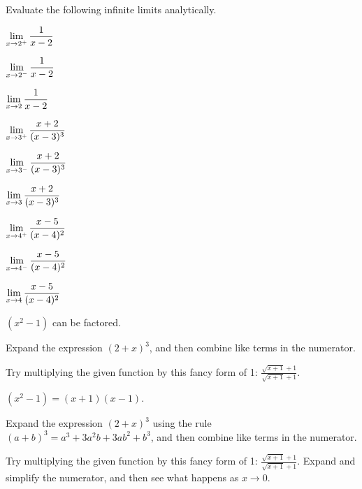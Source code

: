 \begin{activity} \label{A:1.2.1}  Evaluate the following infinite limits analytically.  
\ba
\item 
	\begin{enumerate*}[i)] 
	\item $\displaystyle \lim_{x \to 2^+} \frac{1}{x-2} \quad$ 
	\item $\displaystyle \lim_{x \to 2^-} \frac{1}{x-2} \quad$
	\item $\displaystyle \lim_{x \to 2} \frac{1}{x-2}$ 
	\end{enumerate*}
	
\item 
	\begin{enumerate*}[i)] 
	\item $\displaystyle \lim_{x \to 3^+} \frac{x+2}{(x-3)^3} \quad$ 
	\item $\displaystyle \lim_{x \to 3^-} \frac{x+2}{(x-3)^3} \quad$
	\item $\displaystyle \lim_{x \to 3} \frac{x+2}{(x-3)^3}$ 
	\end{enumerate*}
	
\item
	\begin{enumerate*}[i)] 
	\item $\displaystyle \lim_{x \to 4^+} \frac{x-5}{(x-4)^2} \quad$ 
	\item $\displaystyle \lim_{x \to 4^-} \frac{x-5}{(x-4)^2} \quad$
	\item $\displaystyle \lim_{x \to 4} \frac{x-5}{(x-4)^2}$ 
	\end{enumerate*}
\ea
\end{activity}
\begin{smallhint}
\ba
	\item $(x^2 - 1)$ can be factored.
	\item Expand the expression $(2+x)^3$, and then combine like terms in the numerator.
	\item Try multiplying the given function by this fancy form of 1: $\frac{\sqrt{x+1} + 1}{\sqrt{x+1} + 1}$.
\ea
\end{smallhint}
\begin{bighint}
\ba
	\item $(x^2 - 1) = (x+1)(x-1)$.
	\item Expand the expression $(2+x)^3$ using the rule $(a+b)^3 = a^3 + 3a^2b + 3ab^2 + b^3$, and then combine like terms in the numerator.
	\item Try multiplying the given function by this fancy form of 1: $\frac{\sqrt{x+1} + 1}{\sqrt{x+1} + 1}$.  Expand and simplify the numerator, and then see what happens as $x \to 0$.
\ea
\end{bighint}
